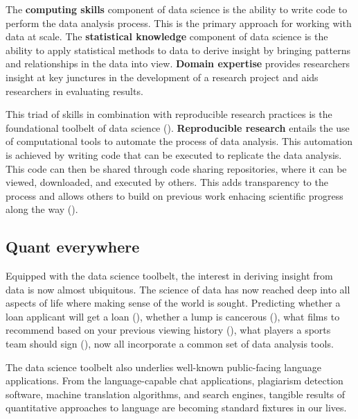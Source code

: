 \documentclass[
  letterpaper,
  krantz1]{latex/krantz-mod}
\theoremstyle{definition}
\theoremstyle{definition}
\theoremstyle{remark}
\begin{document}
The \textbf{computing skills} component of data
science is the ability to write code to perform the data analysis
process. This is the primary approach for working with data at scale.
The \textbf{statistical knowledge}
component of data science is the ability to apply statistical methods to
data to derive insight by bringing patterns and relationships in the
data into view. \textbf{Domain expertise}
provides researchers insight at key junctures in the development of a
research project and aids researchers in evaluating results.

This triad of skills in combination with reproducible research practices
is the foundational toolbelt of data science
(). \textbf{Reproducible
research} entails the use of computational
tools to automate the process of data analysis. This automation is
achieved by writing code that can be executed
to replicate the data analysis. This code can then be shared through
code sharing repositories, where it can
be viewed, downloaded, and executed by others. This adds
transparency to the process and allows
others to build on previous work enhacing scientific progress along the
way ().

\subsection{Quant everywhere}\label{quant-everywhere}

Equipped with the data science toolbelt, the interest in deriving
insight from data is now almost ubiquitous. The science of data has now
reached deep into all aspects of life where making sense of the world is
sought. Predicting whether a loan applicant will get a loan
(), whether a lump is
cancerous (),
what films to recommend based on your previous viewing history
(), what
players a sports team should sign (), now all incorporate a common set of data analysis tools.

The data science toolbelt also underlies well-known public-facing
language applications. From the language-capable
chat applications,
plagiarism detection software,
machine translation algorithms,
and search engines, tangible results of
quantitative approaches to language are becoming standard fixtures in
our lives.
\end{document}
